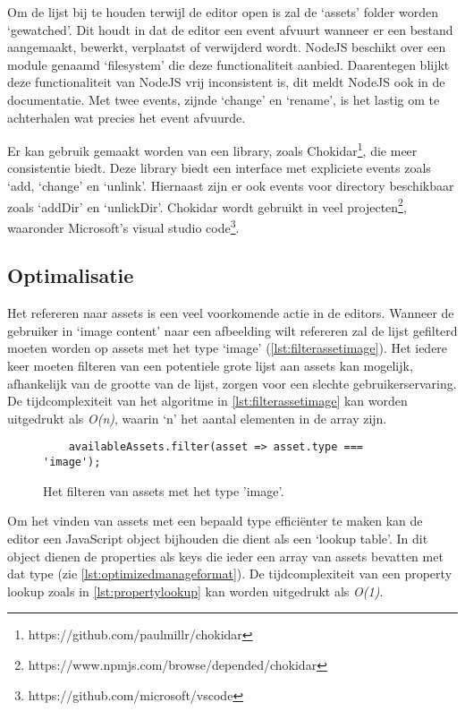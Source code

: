 Om de lijst bij te houden terwijl de editor open is zal de ‘assets’ folder worden ‘gewatched’. Dit houdt in dat de editor een event afvuurt wanneer er een bestand aangemaakt, bewerkt, verplaatst of verwijderd wordt. NodeJS beschikt over een module genaamd ‘filesystem’ die deze functionaliteit aanbied. Daarentegen blijkt deze functionaliteit van NodeJS vrij inconsistent is, dit meldt NodeJS ook in de documentatie\cite{NodeDocFS}. Met twee events, zijnde ‘change’ en ‘rename’, is het lastig om te achterhalen wat precies het event afvuurde. 

Er kan gebruik gemaakt worden van een library, zoals Chokidar\footnote{https://github.com/paulmillr/chokidar}, die meer consistentie biedt. Deze library biedt een interface met expliciete events zoals ‘add, ‘change’ en ‘unlink’. Hiernaast zijn er ook events voor directory beschikbaar zoals ‘addDir’ en ‘unlickDir’. Chokidar wordt gebruikt in veel projecten\footnote{https://www.npmjs.com/browse/depended/chokidar}, waaronder Microsoft’s visual studio code\footnote{https://github.com/microsoft/vscode}. 

\subsection{Optimalisatie}
\label{subsec:optimalisationformat}
Het refereren naar assets is een veel voorkomende actie in de editors. Wanneer de gebruiker in ‘image content’ naar een afbeelding wilt refereren zal de lijst gefilterd moeten worden op assets met het type ‘image’ (\autoref{lst:filterassetimage}). Het iedere keer moeten filteren van een potentiele grote lijst aan assets kan mogelijk, afhankelijk van de grootte van de lijst, zorgen voor een slechte gebruikerservaring. De tijdcomplexiteit van het algoritme in \autoref{lst:filterassetimage} kan worden uitgedrukt als \textit{O(n)}, waarin ‘n’ het aantal elementen in de array zijn. 

\begin{figure}[htb]
    \centering
    \lstset{language=JavaScript}
    \begin{lstlisting}
    availableAssets.filter(asset => asset.type === 'image');
    \end{lstlisting}
    \caption{Het filteren van assets met het type 'image'.}
    \label{lst:filterassetimage}
\end{figure}

Om het vinden van assets met een bepaald type efficiënter te maken kan de editor een JavaScript object bijhouden die dient als een ‘lookup table’. In dit object dienen de properties als keys die ieder een array van assets bevatten met dat type (zie \autoref{lst:optimizedmanageformat}). De tijdcomplexiteit van een property lookup zoals in \autoref{lst:propertylookup} kan worden uitgedrukt als \textit{O(1)}.

